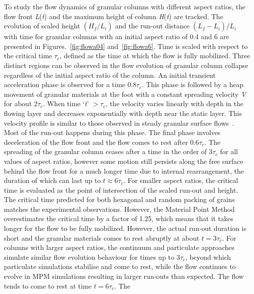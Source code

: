 To study the flow dynamics of granular columns with different aspect ratios, 
the flow front \textit{L}(\textit{t}) and the maximum height of column 
\textit{H}(\textit{t}) are tracked. The evolution of scaled height 
$(H_{\textit{f}}/L_{\textit{i}})$ and the run-out distance 
$(L_{\textit{f}}-L_{\textit{i}})/L_{\textit{i}}$ with time for granular columns 
with an initial aspect ratio of 0.4 and 6 are presented in 
Figures.~\ref{fig:flowa04} and~\ref{fig:flowa6}. Time is scaled with respect to 
the critical time $\tau_{c}$, defined as the time at which the flow is fully 
mobilized. Three distinct regions can be observed in the flow evolution of 
granular column collapse regardless of the initial aspect ratio of the column. 
An initial transient acceleration phase is observed for a time 0.8$\tau_{c}$. 
This phase is followed by a heap movement of granular materials at the foot 
with a constant spreading velocity \textit{V} for about 2$\tau_{c}$. When time 
`\textit{t}' $> \tau_{c}$, the velocity varies linearly with depth in the 
flowing layer and decreases exponentially with depth near the static layer. 
This velocity profile is similar to those observed in steady granular surface 
flows~\citep{Lajeunesse2004}. Most of the run-out happens during this phase. 
The final phase involves deceleration of the flow front and the flow comes to 
rest after 0.6$\tau_{c}$. The spreading of the granular column ceases after a 
time in the order of 3$\tau_{c}$ for all values of aspect ratios, however some 
motion still persists along the free surface behind the flow front for a much 
longer time due to internal rearrangement, the duration of which can last up to 
$\textit{t} \approx 6\tau_{c}$. For smaller aspect ratios, the critical time is 
evaluated as the point of intersection of the scaled run-out and height. The 
critical time predicted for both hexagonal and random packing of grains matches 
the experimental observations. However, the Material Point Method overestimates 
the critical time by a factor of 1.25, which means that it takes longer for the 
flow to be fully mobilized. However, the actual run-out duration is short and 
the granular materials comes to rest abruptly at about $\textit{t}=3\tau_{c}$. 
For columns with larger aspect ratios, the continuum and particulate approaches 
simulate similar flow evolution behaviour for times up to 3$\tau_{c}$, beyond 
which particulate simulations stabilise and come to rest, while the flow 
continues to evolve in MPM simulations resulting in larger run-outs than 
expected. The flow tends to come to rest at time $\textit{t}=6\tau_{c}$. The 
